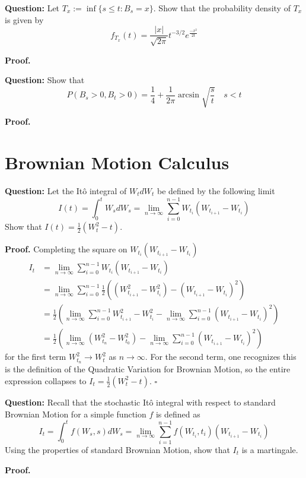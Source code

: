\documentclass{article}
\begin{document}
\begin{tcolorbox}[colframe=black,colback=gray!5,boxrule=0.5pt]
    \textbf{Question:} Let $T_x :=\inf\{s\leq t: B_s=x\}$. Show that the probability density of $T_x$ is given by
    $$f_{T_x}(t) = \frac{|x|}{\sqrt{2\pi}} t^{-3/2} e^{\frac{-x^2}{2t}}$$
\end{tcolorbox}
\textbf{Proof.}


\begin{tcolorbox}[colframe=black,colback=gray!5,boxrule=0.5pt]
    \textbf{Question:} Show that 
    $$P(B_s>0,B_t>0) = \frac{1}{4} + \frac{1}{2\pi}\arcsin{\sqrt{\frac{s}{t}}} \quad s<t$$
\end{tcolorbox}
\textbf{Proof.}


\newpage
\section{Brownian Motion Calculus}

\begin{tcolorbox}[colframe=black,colback=gray!5,boxrule=0.5pt]
\textbf{Question:} Let the Itô integral of $W_tdW_t$ be defined by the following limit
$$I(t) = \int_0^tW_sdW_s = \lim_{n\to\infty}\sum_{i=0}^{n-1}W_{t_i}(W_{t_{i+1}} - W_{t_i})$$
Show that $I(t) = \frac{1}{2}(W_t^2-t)$.
\end{tcolorbox}
\textbf{Proof.} Completing the square on $W_{t_i}(W_{t_{i+1}} - W_{t_i})$
\begin{align*}
    I_t &= \lim_{n\to\infty}\sum_{i=0}^{n-1}W_{t_i}(W_{t_{i+1}} - W_{t_i}) \\
    &= \lim_{n\to\infty}\sum_{i=0}^{n-1}\frac{1}{2}((W_{t_{i+1}}^2-W_{t_i}^2) - (W_{t_{i+1}} - W_{t_i})^2) \\
    &= \frac{1}{2}\left(\lim_{n\to\infty}\sum_{i=0}^{n-1}W_{t_{i+1}}^2-W_{t_i}^2 - \lim_{n\to\infty}\sum_{i=0}^{n-1}(W_{t_{i+1}}-W_{t_i})^2\right) \\
    &= \frac{1}{2}\left(\lim_{n\to\infty}(W_{t_n}^2 - W_{t_0}^2) -  \lim_{n\to\infty}\sum_{i=0}^{n-1}(W_{t_{i+1}}-W_{t_i})^2\right)
\end{align*}
for the first term $W_{t_n}^2\to W_t^2$ as $n\to\infty$. For the second term, one recognizes this is the definition of the Quadratic Variation for Brownian Motion, so the entire expression collapses to $I_t = \frac{1}{2}(W_t^2-t)$. $\square$

\begin{tcolorbox}[colframe=black,colback=gray!5,boxrule=0.5pt]
\textbf{Question:} Recall that the stochastic Itô integral with respect to standard Brownian Motion for a simple function $f$ is defined as 
$$I_t = \int_0^t f(W_s,s)dW_s = \lim_{n\to\infty}\sum_{i=1}^{n-1}f(W_{t_i}, t_i)(W_{t_{i+1}} - W_{t_i})$$
Using the properties of standard Brownian Motion, show that $I_t$ is a martingale.
\end{tcolorbox}
\textbf{Proof.}
\end{document}
